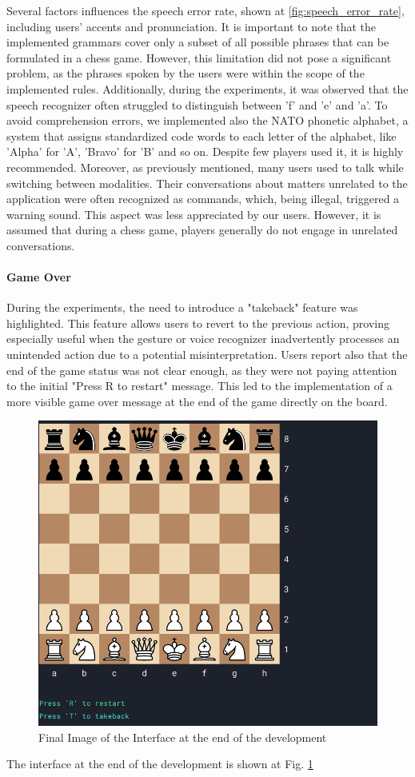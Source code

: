 \documentclass[a4paper, 11pt, twocolumn]{IEEEtran}
\begin{document}
    Several factors influences the speech error rate, shown at \ref{fig:speech_error_rate}, including users' accents and pronunciation. It is important to note that the implemented grammars cover only a subset of all possible phrases that can be formulated in a chess game. However, this limitation did not pose a significant problem, as the phrases spoken by the users were within the scope of the implemented rules. Additionally, during the experiments, it was observed that the speech recognizer often struggled to distinguish between 'f' and 'e' and 'a'. To avoid comprehension errors, we implemented also the NATO phonetic alphabet, a system that assigns standardized code words to each letter of the alphabet, like 'Alpha' for 'A', 'Bravo' for 'B' and so on. Despite few players used it, it is highly recommended. Moreover, as previously mentioned, many users used to talk while switching between modalities. Their conversations about matters unrelated to the application were often recognized as commands, which, being illegal, triggered a warning sound. This aspect was less appreciated by our users. However, it is assumed that during a chess game, players generally do not engage in unrelated conversations.
    \paragraph*{Game Over} During the experiments, the need to introduce a "takeback" feature was highlighted. This feature allows users to revert to the previous action, proving especially useful when the gesture or voice recognizer inadvertently processes an unintended action due to a potential misinterpretation. Users report also that the end of the game status was not clear enough, as they were not paying attention to the initial "Press R to restart" message. This led to the implementation of a more visible game over message at the end of the game directly on the board. 
    \begin{figure}
        \centering
        \includegraphics[width=.45\textwidth]{images/interface.png}
        \caption{Final Image of the Interface at the end of the development}
        \label{fig:interface}
    \end{figure} 
    The interface at the end of the development is shown at Fig. \ref{fig:interface}
\end{document}
